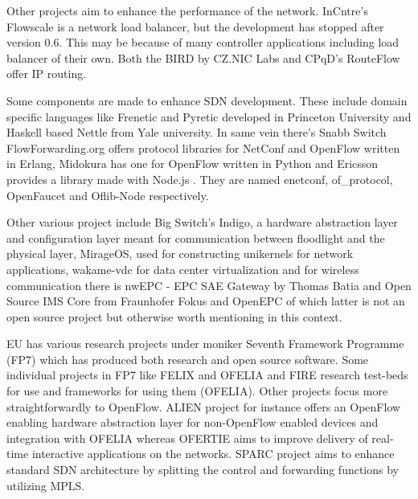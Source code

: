\documentclass[english]{tktltiki2}
\theoremstyle{definition}
\theoremstyle{remark}
\begin{document}
Other projects aim to enhance the performance of the network. InCntre’s Flowscale is a network load balancer, but the development has stopped after version 0.6. This may be because of many controller applications including load balancer of their own. Both the BIRD by CZ.NIC Labs and CPqD’s RouteFlow offer IP routing.

Some components are made to enhance SDN development. These include domain specific languages like Frenetic and Pyretic developed in Princeton University and Haskell based Nettle from Yale university. In same vein there’s Snabb Switch FlowForwarding.org offers protocol libraries for NetConf and OpenFlow written in Erlang, Midokura has one for OpenFlow written in Python and Ericsson provides a library made with Node.js . They are named enetconf, of\_protocol, OpenFaucet and Oflib-Node respectively. 

Other various project include Big Switch’s Indigo, a hardware abstraction layer and configuration layer meant for communication between floodlight and the physical layer, MirageOS, used for constructing unikernels for network applications, wakame-vdc for data center virtualization and for wireless communication there is nwEPC - EPC SAE Gateway by Thomas Batia and Open Source IMS Core from Fraunhofer Fokus and OpenEPC of which latter is not an open source project but otherwise worth mentioning in this context. 

EU has various research projects under moniker Seventh Framework Programme (FP7) which has produced both research and open source software. Some individual projects in FP7 like FELIX and OFELIA and FIRE research test-beds for use and frameworks for using them (OFELIA). Other projects focus more straightforwardly to OpenFlow. ALIEN project for instance offers an OpenFlow enabling hardware abstraction layer for non-OpenFlow enabled devices and integration with OFELIA whereas OFERTIE aims to improve delivery of real-time interactive applications on the networks. SPARC project aims to enhance standard SDN architecture by splitting the control and forwarding functions by utilizing MPLS.





\clearpage






%
%
% 
%


% 





% 
\end{document}
